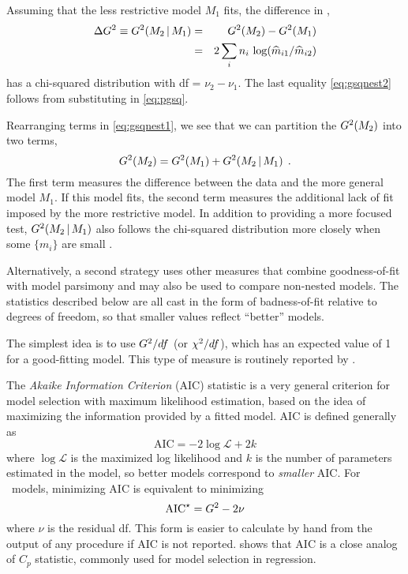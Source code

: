 Assuming that the less restrictive model $M_1$ fits, the difference in
\GSQ,
\begin{eqnarray}
\Delta G^2 \equiv G^2 ( M_2 \, | \, M_1 ) 
& = & G^2 ( M_2 ) - G^2 ( M_1 ) \label{eq:gsqnest1} \\
& = & 2 \sum_i n_i \, \log ( \widehat{m}_{i1} / \widehat{m}_{i2} ) \label{eq:gsqnest2}
\end{eqnarray}
has a chi-squared distribution with df = $\nu_2 - \nu_1$.
The last equality \eqref{eq:gsqnest2} follows from substituting in \eqref{eq:pgsq}.

Rearranging terms in \eqref{eq:gsqnest1}, we see that we can partition
the $G^2 ( M_2 )$ into two terms,
\begin{equation*}
G^2 ( M_2 ) = G^2 ( M_1 ) + G^2 ( M_2 \, | \, M_1 )
\:\: .
\end{equation*}
The first term measures the difference between the data and the more
general model $M_1$.  If this model fits, the second term measures the
additional lack of fit imposed by the more restrictive model. 
In addition to providing a more focused test, $G^2 ( M_2 \, | \, M_1 )$
also follows the chi-squared distribution more closely when some
$\{ m_i \}$ are small
\citep[\S 7.7.6]{Agresti:90}.

Alternatively, a second strategy uses other measures that combine
goodness-of-fit with model parsimony and may also be used to compare
non-nested models.  The statistics described below are all cast in
the form of badness-of-fit relative to degrees of freedom, so that
smaller values reflect ``better'' models.


The simplest idea \citep{Goodman:71}
is to use $G^2 / df$
(or $\chi^2 / df$), which has an expected value of 1 for a good-fitting
model.  This type of measure is routinely
reported by .

The \emph{Akaike Information Criterion} (AIC) statistic
\citep{Akaike:73} is a very general criterion for model selection
with maximum likelihood estimation, based on the idea of maximizing
the information provided by a fitted model.  AIC is defined generally
as 
\begin{equation*}
\mbox{AIC} = -2 \log \mathcal{L} + 2 k
\end{equation*}
where $\log \mathcal{L}$ is the maximized log likelihood and $k$ is
the number of parameters estimated in the model,
so better models correspond to \emph{smaller} AIC.  For \loglin\ models,
minimizing AIC is equivalent to minimizing
\begin{equation*}
\mbox{AIC}^{\star} = G^2 - 2 \nu
\end{equation*}
where $\nu$ is the residual df.  This form is easier to calculate by hand
from the output of any procedure if AIC is not reported.
\citet[\S IV.8]{Christensen:97} shows that
AIC is a close analog of \citet{Mallows:73} $C_p$ statistic, commonly used
for model selection in regression.

